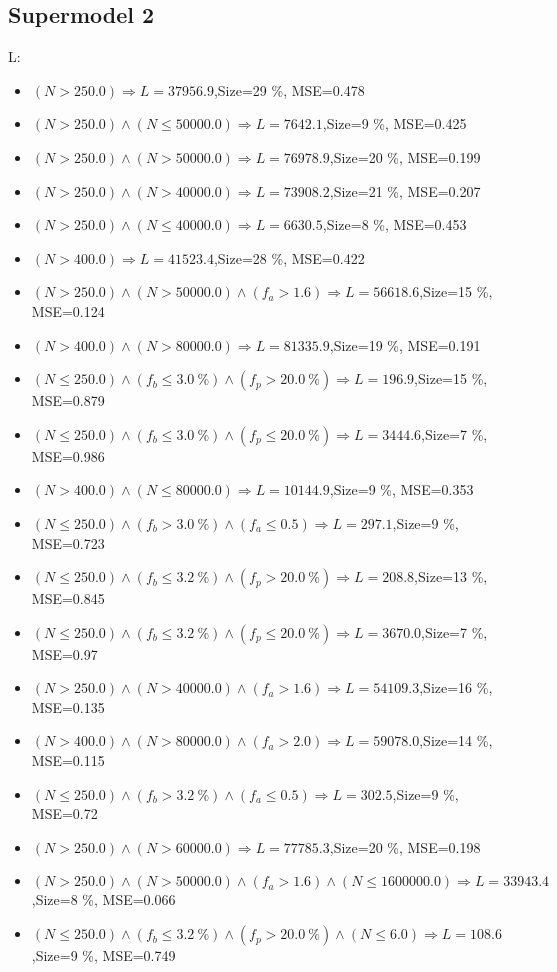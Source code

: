 \documentclass[numbered]{CSL}
\begin{document}
\subsection{Supermodel 2}
L:
\begin{itemize}
\item $(N > 250.0) \Rightarrow L = 37956.9$,\hfill Size=29 \%, MSE=0.478
\item $(N > 250.0) \land (N \leq 50000.0) \Rightarrow L = 7642.1$,\hfill Size=9 \%, MSE=0.425
\item $(N > 250.0) \land (N > 50000.0) \Rightarrow L = 76978.9$,\hfill Size=20 \%, MSE=0.199
\item $(N > 250.0) \land (N > 40000.0) \Rightarrow L = 73908.2$,\hfill Size=21 \%, MSE=0.207
\item $(N > 250.0) \land (N \leq 40000.0) \Rightarrow L = 6630.5$,\hfill Size=8 \%, MSE=0.453
\item $(N > 400.0) \Rightarrow L = 41523.4$,\hfill Size=28 \%, MSE=0.422
\item $(N > 250.0) \land (N > 50000.0) \land (f_a > 1.6) \Rightarrow L = 56618.6$,\hfill Size=15 \%, MSE=0.124
\item $(N > 400.0) \land (N > 80000.0) \Rightarrow L = 81335.9$,\hfill Size=19 \%, MSE=0.191
\item $(N \leq 250.0) \land (f_b \leq 3.0~\%) \land (f_p > 20.0~\%) \Rightarrow L = 196.9$,\hfill Size=15 \%, MSE=0.879
\item $(N \leq 250.0) \land (f_b \leq 3.0~\%) \land (f_p \leq 20.0~\%) \Rightarrow L = 3444.6$,\hfill Size=7 \%, MSE=0.986
\item $(N > 400.0) \land (N \leq 80000.0) \Rightarrow L = 10144.9$,\hfill Size=9 \%, MSE=0.353
\item $(N \leq 250.0) \land (f_b > 3.0~\%) \land (f_a \leq 0.5) \Rightarrow L = 297.1$,\hfill Size=9 \%, MSE=0.723
\item $(N \leq 250.0) \land (f_b \leq 3.2~\%) \land (f_p > 20.0~\%) \Rightarrow L = 208.8$,\hfill Size=13 \%, MSE=0.845
\item $(N \leq 250.0) \land (f_b \leq 3.2~\%) \land (f_p \leq 20.0~\%) \Rightarrow L = 3670.0$,\hfill Size=7 \%, MSE=0.97
\item $(N > 250.0) \land (N > 40000.0) \land (f_a > 1.6) \Rightarrow L = 54109.3$,\hfill Size=16 \%, MSE=0.135
\item $(N > 400.0) \land (N > 80000.0) \land (f_a > 2.0) \Rightarrow L = 59078.0$,\hfill Size=14 \%, MSE=0.115
\item $(N \leq 250.0) \land (f_b > 3.2~\%) \land (f_a \leq 0.5) \Rightarrow L = 302.5$,\hfill Size=9 \%, MSE=0.72
\item $(N > 250.0) \land (N > 60000.0) \Rightarrow L = 77785.3$,\hfill Size=20 \%, MSE=0.198
\item $(N > 250.0) \land (N > 50000.0) \land (f_a > 1.6) \land (N \leq 1600000.0) \Rightarrow L = 33943.4$,\hfill Size=8 \%, MSE=0.066
\item $(N \leq 250.0) \land (f_b \leq 3.2~\%) \land (f_p > 20.0~\%) \land (N \leq 6.0) \Rightarrow L = 108.6$,\hfill Size=9 \%, MSE=0.749
\end{itemize}
\end{document}

